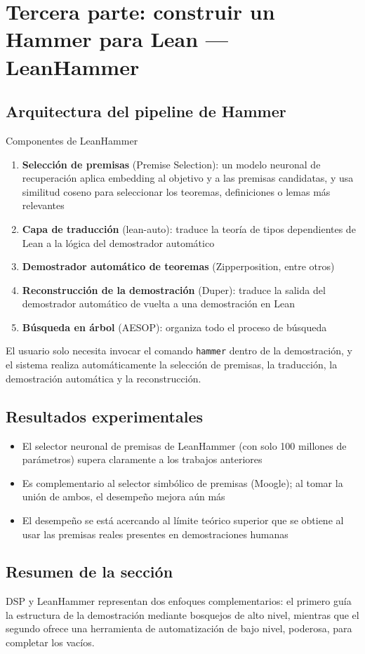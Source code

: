 \section{Tercera parte: construir un Hammer para Lean --- LeanHammer}

\subsection{Arquitectura del pipeline de Hammer}

\begin{importantbox}{Componentes de LeanHammer}
\begin{enumerate}
    \item \textbf{Selección de premisas} (Premise Selection): un modelo neuronal de recuperación aplica embedding al objetivo y a las premisas candidatas, y usa similitud coseno para seleccionar los teoremas, definiciones o lemas más relevantes
    \item \textbf{Capa de traducción} (lean-auto): traduce la teoría de tipos dependientes de Lean a la lógica del demostrador automático
    \item \textbf{Demostrador automático de teoremas} (Zipperposition, entre otros)
    \item \textbf{Reconstrucción de la demostración} (Duper): traduce la salida del demostrador automático de vuelta a una demostración en Lean
    \item \textbf{Búsqueda en árbol} (AESOP): organiza todo el proceso de búsqueda
\end{enumerate}
\end{importantbox}

El usuario solo necesita invocar el comando \texttt{hammer} dentro de la demostración, y el sistema realiza automáticamente la selección de premisas, la traducción, la demostración automática y la reconstrucción.

\subsection{Resultados experimentales}

\begin{itemize}
    \item El selector neuronal de premisas de LeanHammer (con solo 100 millones de parámetros) supera claramente a los trabajos anteriores
    \item Es complementario al selector simbólico de premisas (Moogle); al tomar la unión de ambos, el desempeño mejora aún más
    \item El desempeño se está acercando al límite teórico superior que se obtiene al usar las premisas reales presentes en demostraciones humanas
\end{itemize}

\subsection{Resumen de la sección}

DSP y LeanHammer representan dos enfoques complementarios: el primero guía la estructura de la demostración mediante bosquejos de alto nivel, mientras que el segundo ofrece una herramienta de automatización de bajo nivel, poderosa, para completar los vacíos.
